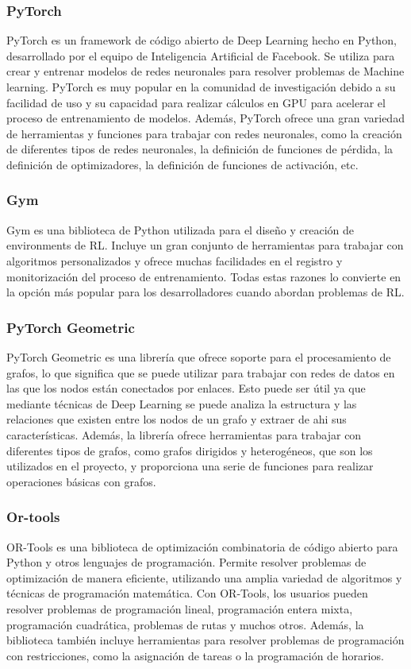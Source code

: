 \subsubsection{PyTorch}
PyTorch\cite{PyTorch} es un framework de código abierto de Deep Learning hecho en Python, desarrollado por el equipo 
de Inteligencia Artificial de Facebook. Se utiliza para crear y entrenar modelos de redes neuronales para resolver 
problemas de Machine learning. PyTorch es muy popular en la comunidad de investigación debido a su facilidad de uso 
y su capacidad para realizar cálculos en GPU para acelerar el proceso de entrenamiento de modelos. Además, PyTorch
ofrece una gran variedad de herramientas y funciones para trabajar con redes neuronales, como la creación de
diferentes tipos de redes neuronales, la definición de funciones de pérdida, la definición de optimizadores, la 
definición de funciones de activación, etc.

\subsubsection{Gym}
Gym\cite{Gym} es una biblioteca de Python utilizada para el diseño y creación de environments de RL. Incluye un 
gran conjunto de herramientas para trabajar con algoritmos personalizados y ofrece muchas facilidades en 
el registro y monitorización del proceso de entrenamiento. Todas estas razones lo convierte en la opción más popular 
para los desarrolladores cuando abordan problemas de RL.

\subsubsection{PyTorch Geometric}
PyTorch Geometric\cite{pytorch-geometric} es una librería que ofrece soporte para el procesamiento de grafos, lo que significa 
que se puede utilizar para trabajar con redes de datos en las que los nodos están conectados por enlaces. 
Esto puede ser útil ya que mediante técnicas de Deep Learning se puede analiza la estructura y las 
relaciones que existen entre los nodos de un grafo y extraer de ahi sus características. Además, la 
librería ofrece herramientas para trabajar con diferentes tipos de grafos, como grafos dirigidos y heterogéneos, 
que son los utilizados en el proyecto, y proporciona una serie de funciones para realizar 
operaciones básicas con grafos.

\subsubsection{Or-tools}
OR-Tools\cite{ortools} es una biblioteca de optimización combinatoria de código abierto para Python y otros 
lenguajes de programación. Permite resolver problemas de optimización de manera eficiente, utilizando una 
amplia variedad de algoritmos y técnicas de programación matemática. Con OR-Tools, los usuarios pueden 
resolver problemas de programación lineal, programación entera mixta, programación cuadrática, 
problemas de rutas y muchos otros. Además, la biblioteca también incluye herramientas para resolver 
problemas de programación con restricciones, como la asignación de tareas o la programación de horarios.

